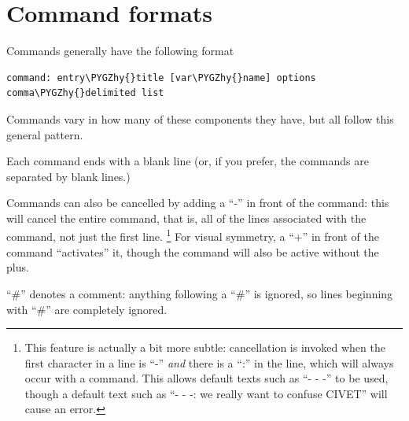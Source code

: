 \documentclass[letterpaper,10pt,english]{sphinxmanual}
\def\PYGZhy{\char`\-}
\begin{document}
\section{Command formats}
\label{forms:command-formats}
Commands generally have the following format

\begin{Verbatim}[commandchars=\\\{\}]
command: entry\PYGZhy{}title [var\PYGZhy{}name] options
comma\PYGZhy{}delimited list
\end{Verbatim}

Commands vary in how many of these components they have, but all follow
this general pattern.

Each command ends with a blank line (or, if you prefer, the commands are
separated by blank lines.)

Commands can also be cancelled by adding a “-” in front of the command:
this will cancel the entire command, that is, all of the lines
associated with the command, not just the first line. \footnote{
This feature is actually a bit more subtle: cancellation is invoked when
the first character in a line is “-” \emph{and} there is a “:” in the line,
which will always occur with a command. This allows default texts such as “- - -”
to be used, though a default text such as “- - -: we really want to confuse CIVET”
will cause an error.
}  For visual
symmetry, a “+” in front of the command “activates” it, though the
command will also be active without the plus.

“\#” denotes a comment: anything following a “\#” is ignored, so lines
beginning with “\#” are completely ignored.
\end{document}
